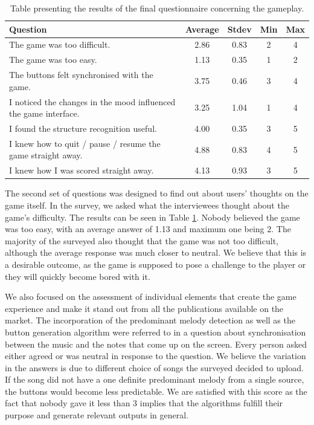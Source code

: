 \begin{table}
\begin{center}
\begin{tabular}{| p{8cm} | c | c | c | c | } 																			   \hline 
 \textbf{Question} & \textbf{Average} & \textbf{Stdev} & \textbf{Min} & \textbf{Max }	\\ \hline \hline
 The game was too difficult. 														& 2.86 & 0.83 & 2 & 4 \\ \hline		
 The game was too easy. 															& 1.13 & 0.35 & 1 & 2  \\ \hline
 The buttons felt synchronised with the game. 								& 3.75 & 0.46 & 3 & 4	 \\ \hline
 I noticed the changes in the mood influenced the game interface.	& 3.25 & 1.04 & 1 & 4	 \\ \hline
 I found the structure recognition useful.										& 4.00 & 0.35 & 3 & 5  \\ \hline
 I knew how to quit / pause / resume the game straight away.			& 4.88 & 0.83 & 4 & 5	 \\ \hline
 I knew how I was scored straight away.										& 4.13 & 0.93 & 3 & 5	 \\ \hline
 \end{tabular}
\caption{Table presenting the results of the final questionnaire concerning the gameplay.}
\label{table:finalquestionsgameplay}
\end{center}
\end{table}

The second set of questions was designed to find out about users' thoughts on the game itself. In the survey, we asked what the interviewees thought about the game's difficulty. The results can be seen in Table \ref{table:finalquestionsgameplay}. Nobody believed the game was too easy, with an average answer of 1.13 and maximum one being 2. The majority of the surveyed also thought that the game was not too difficult, although the average response was much closer to neutral. We believe that this is a desirable outcome, as the game is supposed to pose a challenge to the player or they will quickly become bored with it. 

We also focused on the assessment of individual elements that create the game experience and make it stand out from all the publications available on the market. The incorporation of the predominant melody detection as well as the button generation algorithm were referred to in a question about synchronisation between the music and the notes that come up on the screen. Every person asked either agreed or was neutral in response to the question. We believe the variation in the answers is due to different choice of songs the surveyed decided to upload. If the song did not have a one definite predominant melody from a single source, the buttons would become less predictable. 
We are satisfied with this score as the fact that nobody gave it less than 3 implies that the algorithms fulfill their purpose and generate relevant outputs in general.

